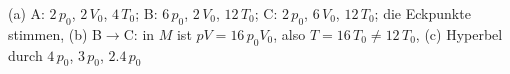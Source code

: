 (a) A: $2\,p_0$, $2\,V_0$, $4\,T_0$; B: $6\,p_0$, $2\,V_0$, $12\,T_0$; C: $2\,p_0$, $6\,V_0$, $12\,T_0$; die Eckpunkte stimmen, (b) B$\to$C: in $M$ ist $pV = 16\,p_0V_0$, also $T = 16\,T_0 \neq 12\,T_0$, (c) Hyperbel durch $4\,p_0$, $3\,p_0$, $2.4\,p_0$
